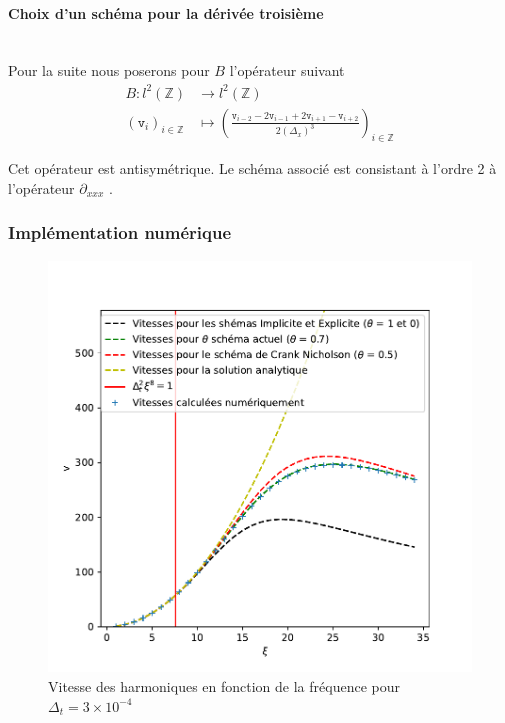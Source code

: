 \documentclass[12pt,a4paper]{article}
\numberwithin{equation}{section}
\begin{document}
\paragraph{Choix d'un schéma pour la dérivée troisième}\,\\

Pour la suite nous poserons pour $B$ l'opérateur suivant
\begin{align*}
        B : l^2(\mathbb{Z}) &\longrightarrow l^2(\mathbb{Z})\\
        (\texttt{v}_i)_{i\in\mathbb{Z}} &\mapsto \left(\frac{\texttt{v}_{i-2} - 2\texttt{v}_{i-1} + 2\texttt{v}_{i+1}-\texttt{v}_{i+2} }{2(\Delta_x)^3}\right)_{i\in\mathbb{Z}}
\end{align*}

Cet opérateur est antisymétrique. Le schéma associé est consistant à l'ordre 2 à l'opérateur $ \partial_{xxx}$ .

\subsubsection{Implémentation numérique}

\begin{figure}[H]
    \centering
    \includegraphics[scale = 0.5]{graphs/v_xi en fonction de dt.pdf}
    \caption{Vitesse des harmoniques en fonction de la fréquence pour $\Delta_t = 3\times10^{-4}$}
    \label{fig:enter-label}
\end{figure}
\end{document}
